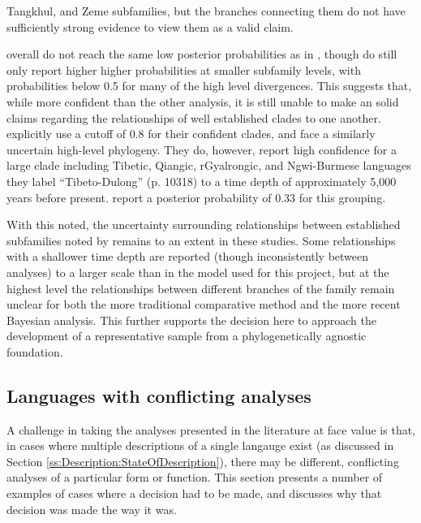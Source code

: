 Tangkhul, and Zeme subfamilies, but the branches connecting them do not have sufficiently strong evidence to view them as a valid claim.

 overall do not reach the same low posterior probabilities as in , though do still only report higher higher probabilities at smaller subfamily levels, with probabilities below 0.5 for many of the high level divergences. This suggests that, while more confident than the other analysis, it is still unable to make an solid claims regarding the relationships of well established clades to one another.  explicitly use a cutoff of 0.8 for their confident clades, and face a similarly uncertain high-level phylogeny. They do, however, report high confidence for a large clade including Tibetic, Qiangic, rGyalrongic, and Ngwi-Burmese languages they label ``Tibeto-Dulong'' (p. 10318) to a time depth of approximately 5,000 years before present.  report a posterior probability of 0.33 for this grouping.

With this noted, the uncertainty surrounding relationships between established subfamilies noted by  remains to an extent in these studies. Some relationships with a shallower time depth are reported (though inconsistently between analyses) to a larger scale than in the model used for this project, but at the highest level the relationships between different branches of the family remain unclear for both the more traditional comparative method and the more recent Bayesian analysis. This further supports the decision here to approach the development of a representative sample from a phylogenetically agnostic foundation.

\subsection{Languages with conflicting analyses}\label{ss:Description:Conflicts}
A challenge in taking the analyses presented in the literature at face value is that, in cases where multiple descriptions of a single langauge exist (as discussed in Section \ref{ss:Description:StateOfDescription}), there may be different, conflicting analyses of a particular form or function. This section presents a number of examples of cases where a decision had to be made, and discusses why that decision was made the way it was. 

